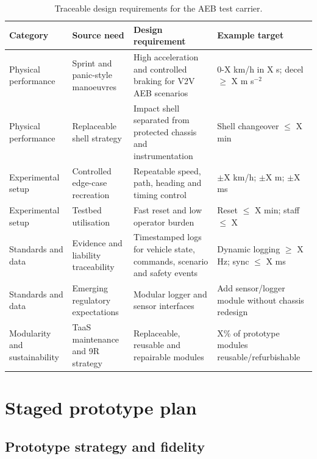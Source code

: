 \begin{table}[H]
\centering
\caption{Traceable design requirements for the AEB test carrier.}
\label{tab:ch8_requirement_matrix}
\begin{tabular}{p{}p{}p{}p{}}
\toprule
\textbf{Category} & \textbf{Source need} & \textbf{Design requirement} & \textbf{Example target} \\
\midrule
Physical performance & Sprint and panic-style manoeuvres & High acceleration and controlled braking for V2V AEB scenarios & 0-X km/h in X s; decel $\geq$ X m s$^{-2}$ \\
\midrule
Physical performance & Replaceable shell strategy & Impact shell separated from protected chassis and instrumentation & Shell changeover $\leq$ X min \\
\midrule
Experimental setup & Controlled edge-case recreation & Repeatable speed, path, heading and timing control & $\pm$X km/h; $\pm$X m; $\pm$X ms \\
\midrule
Experimental setup & Testbed utilisation & Fast reset and low operator burden & Reset $\leq$ X min; staff $\leq$ X \\
\midrule
Standards and data & Evidence and liability traceability & Timestamped logs for vehicle state, commands, scenario and safety events & Dynamic logging $\geq$ X Hz; sync $\leq$ X ms \\
\midrule
Standards and data & Emerging regulatory expectations & Modular logger and sensor interfaces & Add sensor/logger module without chassis redesign \\
\midrule
Modularity and sustainability & TaaS maintenance and 9R strategy & Replaceable, reusable and repairable modules & X\% of prototype modules reusable/refurbishable \\
\bottomrule
\end{tabular}
\end{table}

\section{Staged prototype plan}
\label{sec:prototype_roadmap_compact}
\label{sec:ch8_staged_prototype_plan}

\subsection{Prototype strategy and fidelity}
\label{sec:ch8_prototype_strategy_fidelity}

